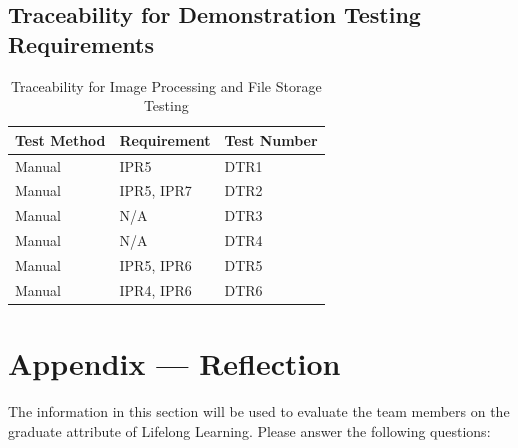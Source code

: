 \documentclass[12pt, titlepage]{article}
\begin{document}
\subsection{Traceability for Demonstration Testing Requirements}
\begin{table}[H]
\begin{tabular}{|p{}|p{}|p{}|}

\hline Test Method&Requirement&Test Number\\
\hline Manual&IPR5&DTR1\\
\hline Manual&IPR5, IPR7&DTR2\\
\hline Manual&N/A&DTR3\\
\hline Manual&N/A&DTR4\\
\hline Manual&IPR5, IPR6&DTR5\\
\hline Manual&IPR4, IPR6&DTR6\\
\hline

\end{tabular}
\caption{Traceability for Image Processing and File Storage Testing}
\end{table}




\newpage{}
\section*{Appendix --- Reflection}

The information in this section will be used to evaluate the team members on the
graduate attribute of Lifelong Learning.  Please answer the following questions:
\end{document}
